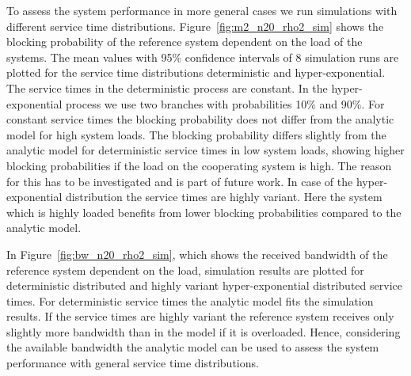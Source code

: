 To assess the system performance in more general cases we run simulations with different service time distributions.
Figure~\ref{fig:m2_n20_rho2_sim} shows the blocking probability of the reference system dependent on the load of the systems. The mean values with 95\% confidence intervals of 8 simulation runs are plotted for the service time distributions deterministic and hyper-exponential.
The service times in the deterministic process are constant.
In the hyper-exponential process we use two branches with probabilities 10\% and 90\%.
For constant service times the blocking probability does not differ from the analytic model for high system loads. The blocking probability differs slightly from the analytic model for deterministic service times in low system loads, showing higher blocking probabilities if the load on the cooperating system is high. The reason for this has to be investigated and is part of future work. In case of the hyper-exponential distribution the service times are highly variant. Here the system which is highly loaded benefits from lower blocking probabilities compared to the analytic model.


In Figure~\ref{fig:bw_n20_rho2_sim}, which shows the received bandwidth of the reference system dependent on the load, simulation results are plotted for deterministic distributed and highly variant hyper-exponential distributed service times.
For deterministic service times the analytic model fits the simulation results. If the service times are highly variant the reference system receives only slightly more bandwidth than in the model if it is overloaded. Hence, considering the available bandwidth the analytic model can be used to assess the system performance with general service time distributions.

